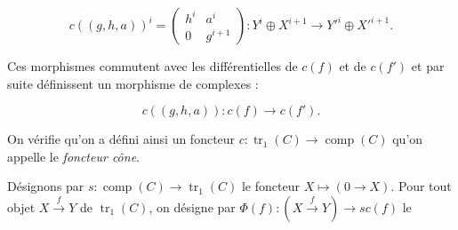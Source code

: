 \begin{equation}
  c((g,h,a))^i=
  \begin{pmatrix}
    h^i & a^i\\
    0 & g^{i+1}
  \end{pmatrix}
  \colon Y^i\oplus X^{i+1}\longrightarrow Y'^i\oplus X'^{i+1}.
  \tag{3.1.2.2}
\end{equation}

Ces morphismes commutent avec les différentielles de $c(f)$ et de $c(f')$
et par suite définissent un morphisme de complexes :

\begin{equation}
  c((g,h,a))\colon c(f)\longrightarrow c(f').
  \tag{3.1.2.3}
\end{equation}

On vérifie qu'on a défini ainsi un foncteur
$c\colon\operatorname{tr}_1(C)\longrightarrow\operatorname{comp}(C)$
qu'on appelle le \emph{foncteur cône}.

Désignons par
$s\colon\operatorname{comp}(C)\longrightarrow\operatorname{tr}_1(C)$
le foncteur $X\longmapsto(0\longrightarrow X)$.
Pour tout objet $X\xrightarrow{f}Y$ de $\operatorname{tr}_1(C)$, on désigne par
$\Phi(f)\colon(X\xrightarrow{f}Y)\longrightarrow s c(f)$ le

